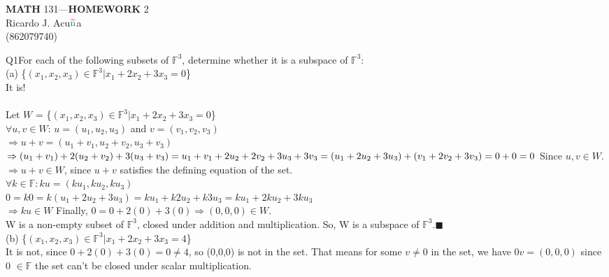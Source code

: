 \documentclass{article}
\begin{document}
\begin{center}
  \textbf{MATH} 131---\textbf{HOMEWORK} 2\\
  \color{red}R\color{teal}icardo
  \color{red}J\color{cyan}.
  \color{red}A\color{teal}cu$\color{red}{\widetilde{\color{teal}\text{n}}}$\color{teal}a\color{black}\\
  \color{teal}(\color{red}862079740\color{teal})\color{black}\\
\end{center}
Q1\quad For each of the following subsets of $\mathbb{F}^3$, determine
whether it is a subspace of $\mathbb{F}^3$:\\

(a) \{$(x_1,x_2,x_3)\in \mathbb{F}^3| x_1 + 2x_2 + 3x_3 = 0$\}\\

It is!\\

\\
Let $W$ = \{$(x_1,x_2,x_3)\in \mathbb{F}^3| x_1 + 2x_2 + 3x_3 = 0$\}\\

$\forall u,v \in W$: $u = (u_1,u_2,u_3)$ and $v = (v_1,v_2,v_3)$\\
$\Rightarrow u+v = (u_1+v_1,u_2+v_2,u_3+v_3)$\\
$\Rightarrow (u_1 + v_1) + 2(u_2 + v_2) + 3(u_3 + v_3) =\\
u_1 + v_1 + 2u_2 + 2v_2 + 3u_3 + 3v_3 =\\
(u_1 + 2u_2 + 3u_3)+ (v_1 + 2v_2 + 3v_3) =\\ 0 + 0 = 0$ Since $ u,v \in W.$\\
$\Rightarrow u+v \in W$, since $u+v$ satisfies the defining equation
of the set.\\

$\forall k \in \mathbb{F}: ku = (ku_1,ku_2,ku_3)$\\
$0 = k0 = k(u_1 + 2u_2 + 3u_3) = ku_1 + k2u_2 +
k3u_3 = ku_1 + 2ku_2 +
3ku_3$\\
$\Rightarrow ku \in W$
Finally, $0 = 0+2(0)+3(0) \Rightarrow (0,0,0) \in W$.\\

W is a non-empty subset of $\mathbb{F}^3$, closed
under addition and multiplication. So, W is a subspace of
$\mathbb{F}^3$.\enskip$\blacksquare$\\

(b) \{$(x_1,x_2,x_3)\in \mathbb{F}^3| x_1 + 2x_2 + 3x_3 = 4$\}\\

It is not, since $0 + 2(0) + 3(0) = 0 \neq 4$, so (0,0,0) is not in
the set. That means for some $v \neq 0$ in the set, we have  $0v = (0,0,0)$ since 0 $\in \mathbb{F}$ the set can't
be closed under scalar multiplication.\\
\end{document}
